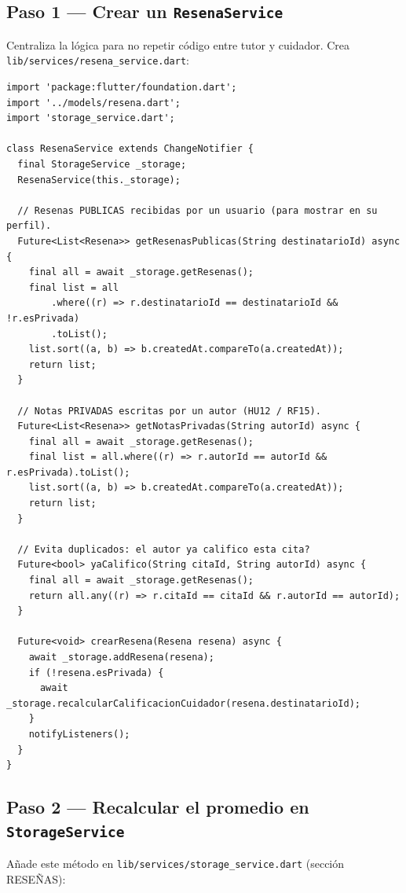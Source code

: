\documentclass[11pt,a4paper]{article}
\begin{document}
\subsection{Paso 1 — Crear un \texttt{ResenaService}}
Centraliza la lógica para no repetir código entre tutor y cuidador.
Crea \texttt{lib/services/resena\_service.dart}:

\begin{lstlisting}
import 'package:flutter/foundation.dart';
import '../models/resena.dart';
import 'storage_service.dart';

class ResenaService extends ChangeNotifier {
  final StorageService _storage;
  ResenaService(this._storage);

  // Resenas PUBLICAS recibidas por un usuario (para mostrar en su perfil).
  Future<List<Resena>> getResenasPublicas(String destinatarioId) async {
    final all = await _storage.getResenas();
    final list = all
        .where((r) => r.destinatarioId == destinatarioId && !r.esPrivada)
        .toList();
    list.sort((a, b) => b.createdAt.compareTo(a.createdAt));
    return list;
  }

  // Notas PRIVADAS escritas por un autor (HU12 / RF15).
  Future<List<Resena>> getNotasPrivadas(String autorId) async {
    final all = await _storage.getResenas();
    final list = all.where((r) => r.autorId == autorId && r.esPrivada).toList();
    list.sort((a, b) => b.createdAt.compareTo(a.createdAt));
    return list;
  }

  // Evita duplicados: el autor ya califico esta cita?
  Future<bool> yaCalifico(String citaId, String autorId) async {
    final all = await _storage.getResenas();
    return all.any((r) => r.citaId == citaId && r.autorId == autorId);
  }

  Future<void> crearResena(Resena resena) async {
    await _storage.addResena(resena);
    if (!resena.esPrivada) {
      await _storage.recalcularCalificacionCuidador(resena.destinatarioId);
    }
    notifyListeners();
  }
}
\end{lstlisting}

\subsection{Paso 2 — Recalcular el promedio en \texttt{StorageService}}
Añade este método en \texttt{lib/services/storage\_service.dart}
(sección RESEÑAS):
\end{document}
